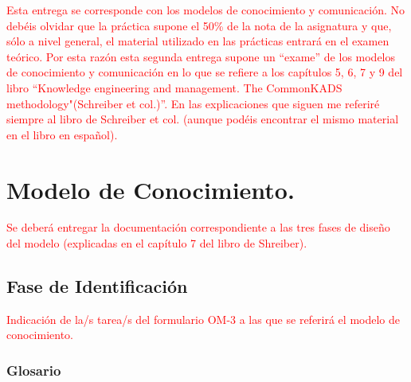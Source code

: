 \documentclass[12pt,a4paper,twoside,spanish]{article}      %
\begin{document}
 \pagestyle{myheadings} 

\setlength{\parindent}{1,5cm} \setlength{\parskip}{0,7cm}


\textcolor {red} {Esta entrega se corresponde con los modelos de conocimiento y comunicación.  No debéis olvidar que la práctica supone el 50\% de la nota de la asignatura y que, sólo a nivel general, el material utilizado en las prácticas entrará en el examen teórico. Por esta razón esta segunda entrega supone un ``exame'' de los modelos de conocimiento y comunicación en lo que se refiere a los capítulos 5, 6, 7 y 9 del libro ``Knowledge engineering and management. The CommonKADS methodology"(Schreiber et col.)''. En las explicaciones que siguen me referiré siempre al libro de Schreiber et col. (aunque podéis encontrar el mismo material en el libro en español).}


\section{Modelo de Conocimiento.}

\textcolor {red} {Se deberá entregar la documentación correspondiente a las tres fases de diseño del modelo (explicadas en el capítulo 7 del libro de Shreiber).}

\subsection{Fase de Identificación}

\textcolor {red} {Indicación de la/s tarea/s del formulario OM-3 a las que se referirá el modelo de conocimiento.}

\subsubsection{Glosario}
\end{document}
